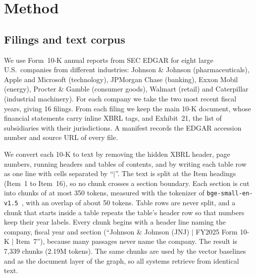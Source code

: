 \documentclass[10pt,twocolumn,letterpaper]{article}
\begin{document}
\section{Method}
\label{sec:method}

\subsection{Filings and text corpus}
\label{sec:filings}
We use Form~10-K annual reports from SEC EDGAR for eight large U.S.\ companies from different
industries: Johnson \& Johnson (pharmaceuticals), Apple and Microsoft (technology), JPMorgan Chase
(banking), Exxon Mobil (energy), Procter \& Gamble (consumer goods), Walmart (retail) and
Caterpillar (industrial machinery). For each company we take the two most recent fiscal years, giving
16 filings. From each filing we keep the main 10-K document, whose financial statements carry inline
XBRL tags, and Exhibit~21, the list of subsidiaries with their jurisdictions. A manifest records the
EDGAR accession number and source URL of every file.

We convert each 10-K to text by removing the hidden XBRL header, page numbers, running headers and
tables of contents, and by writing each table row as one line with cells separated by ``$|$''. The
text is split at the Item headings (Item~1 to Item~16), so no chunk crosses a section boundary. Each
section is cut into chunks of at most 350 tokens, measured with the tokenizer of
\texttt{bge-small-en-v1.5}~\cite{xiao2023cpack}, with an overlap of about 50 tokens. Table rows are
never split, and a chunk that starts inside a table repeats the table's header row so that numbers
keep their year labels. Every chunk begins with a header line naming the company, fiscal year and
section (\eg ``Johnson \& Johnson (JNJ) $|$ FY2025 Form 10-K $|$ Item~7''), because many passages
never name the company. The result is 7,339 chunks (2.19M tokens). The same chunks are used by the
vector baselines and as the document layer of the graph, so all systems retrieve from identical text.
\end{document}
